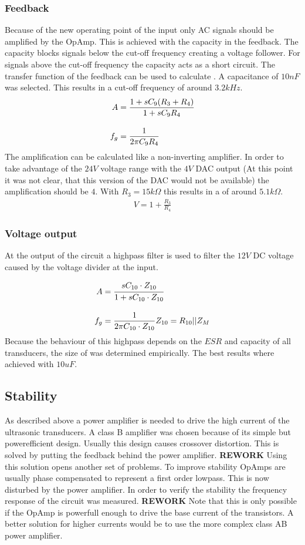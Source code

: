 \subsubsection*{Feedback}
%
Because of the new operating point of the input only AC signals should be amplified by the OpAmp. This is achieved with the capacity  in the feedback. The capacity blocks signals below the cut-off frequency creating a voltage follower. For signals above the cut-off frequency the capacity acts as a short circuit. The transfer function of the feedback can be used to calculate . A capacitance of $10nF$ was selected. This results in a cut-off frequency of around $3.2kHz$.
%
\begin{align}
  A &= \frac{1 + s C_9 (R_3 + R_4)}{1 + s C_9 R_4}\pmath
  f_g &= \frac{1}{2 \pi C_9 R_4}
\end{align}
%
The amplification can be calculated like a non-inverting amplifier. In order to take advantage of the $24V$ voltage range with the $4V$ DAC output (At this point it was not clear, that this version of the DAC would not be available) the amplification should be $4$. With $R_3 = 15k\Omega$ this results in a  of around $5.1k\Omega$.
%
\begin{align}
  V = 1 + \frac{R_3}{R_4}
\end{align}
%
\subsubsection*{Voltage output}
At the output of the circuit a highpass filter is used to filter the $12V$ DC voltage caused by the voltage divider at the input.

\begin{align}
  A &= \cfrac{sC_{10} \cdot Z_{10}}{1 + sC_{10} \cdot Z_{10}} \pmath
  f_g &= \frac{1}{2 \pi C_{10} \cdot Z_{10}}
  Z_{10} = R_{10} || Z_M
\end{align}
%
Because the behaviour of this highpass depends on the $ESR$ and capacity of all transducers, the size of  was determined empirically. The best results where achieved with $10uF$.

\subsection{Stability}

As described above a power amplifier is needed to drive the high current of the ultrasonic transducers. A class B amplifier was chosen because of its simple but powerefficient design. Usually this design causes crossover distortion. This is solved by putting the feedback behind the power amplifier.\p
%
\textbf{REWORK}\p
Using this solution opens another set of problems. To improve stability OpAmps are usually phase compensated to represent a first order lowpass. This is now disturbed by the power amplifier.\p
%
In order to verify the stability the frequency response of the circuit was measured.\p
\textbf{REWORK}\p
%
Note that this is only possible if the OpAmp is powerfull enough to drive the base current of the transistors. A better solution for higher currents would be to use the more complex class AB power amplifier.\p